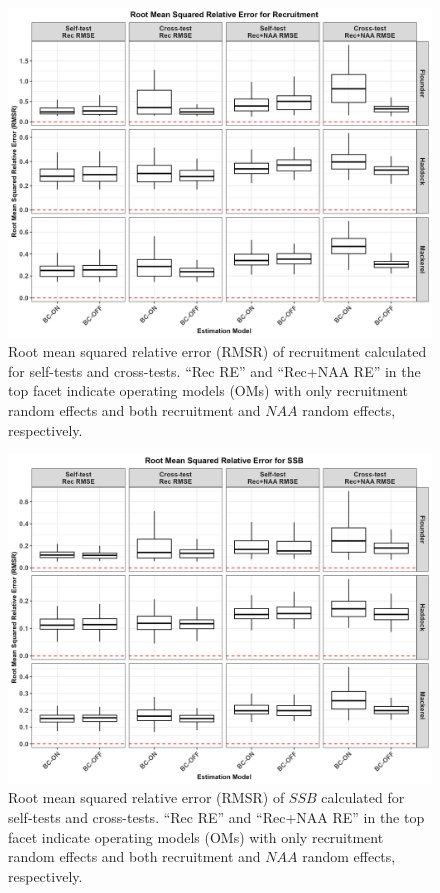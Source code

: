 \documentclass[
  12pt,
]{article}
\begin{document}
\begin{figure}[H]
    \centering
    \includegraphics[width=\textwidth]{Revised_Figures&Tables/RMSR_Rec.PNG}
    \caption{Root mean squared relative error (RMSR) of recruitment calculated for self-tests and cross-tests. ``Rec RE'' and ``Rec+NAA RE'' in the top facet indicate operating models (OMs) with only recruitment random effects and both recruitment and $NAA$ random effects, respectively.}
    \label{fig:supp_Rec_RMSR}
\end{figure}

\begin{figure}[H]
    \centering
    \includegraphics[width=\textwidth]{Revised_Figures&Tables/RMSR_SSB.PNG}
    \caption{Root mean squared relative error (RMSR) of $SSB$ calculated for self-tests and cross-tests. ``Rec RE'' and ``Rec+NAA RE'' in the top facet indicate operating models (OMs) with only recruitment random effects and both recruitment and $NAA$ random effects, respectively.}
    \label{fig:supp_SSB_RMSR}
\end{figure}
\end{document}
